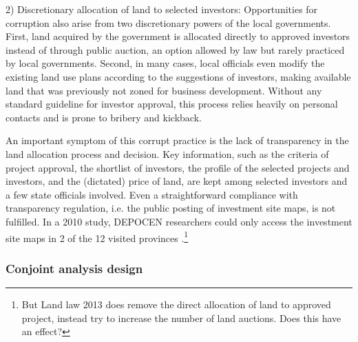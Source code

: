 2) Discretionary allocation of land to selected investors: Opportunities for corruption also arise from two discretionary powers of the local governments. First, land acquired by the government is allocated directly to approved investors instead of through public auction, an option allowed by law but rarely practiced by local governments. Second, in many cases, local officials even modify the existing land use plans according to the suggestions of investors, making available land that was previously not zoned for business development. Without any standard guideline for investor approval, this process relies heavily on personal contacts and is prone to bribery and kickback.

An important symptom of this corrupt practice is the lack of transparency in the land allocation process and decision. Key information, such as the criteria of project approval, the shortlist of investors, the profile of the selected projects and investors, and the (dictated) price of land, are kept among selected investors and a few state officials involved. Even a straightforward compliance with transparency regulation, i.e. the public posting of investment site maps, is not fulfilled. In a 2010 study, DEPOCEN researchers could only access the investment site maps in 2 of the 12 visited provinces \citep{Anderson2011}.\footnote{But Land law 2013 does remove the direct allocation of land to approved project, instead try to increase the number of land auctions. Does this have an effect?}

\subsubsection{Conjoint analysis design}

